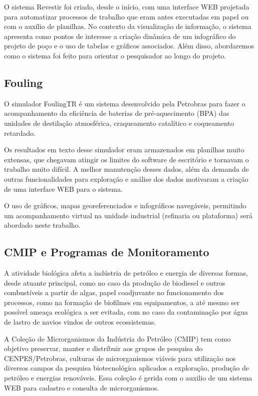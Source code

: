 \documentclass[]{article}
\begin{document}
O sistema Revestir foi criado, desde o início, com uma interface WEB projetada para automatizar processos de trabalho que eram antes executadas em papel ou com o auxílio de planilhas. No contexto da visualização de informação, o sistema apresenta como pontos de interesse a criação dinâmica de um infográfico do projeto de poço e o uso de tabelas e gráficos associados. Além disso, abordaremos como o sistema foi feito para orientar o pesquisador ao longo do projeto.

\subsection{Fouling}

O simulador FoulingTR é um sistema desenvolvido pela Petrobras para fazer o acompanhamento da eficiência de baterias de pré-aquecimento (BPA) das unidades de destilação atmosférica, craqueamento catalítico e coqueamento retardado.

Os resultados em texto desse simulador eram armazenados em planilhas muito extensas, que chegavam atingir os limites do software de escritório e tornavam o trabalho muito difícil. A melhor manutenção desses dados, além da demanda de outras funcionalidades para exploração e análise dos dados motivaram a criação de uma interface WEB para o sistema.

O uso de gráficos, mapas georeferenciados e infográficos navegáveis, permitindo um acompanhamento virtual na unidade industrial (refinaria ou plataforma) será abordado neste trabalho.

\subsection{CMIP e Programas de Monitoramento}

A atividade biológica afeta a indústria de petróleo e energia de diversas formas, desde atuante principal, como no caso da produção de biodiesel e outros combustíveis a partir de algas, papel coadjuvante no funcionamento dos processos, como na formação de biofilmes em equipamentos, a até mesmo ser possível ameaça ecológica a ser evitada, com no  caso da contaminação por água de lastro de navios vindos de outros ecossistemas.

A Coleção de Microrganismos da Indústria do Petróleo (CMIP) tem como objetivo preservar, manter e distribuir aos grupos de pesquisa do CENPES/Petrobras, culturas de microrganismos viáveis para utilização nos diversos campos da pesquisa biotecnológica aplicados a exploração, produção de petróleo e energias renováveis. Essa coleção é gerida com o auxilio de um sistema WEB para cadastro e consulta de microrganismos. 
\end{document}
